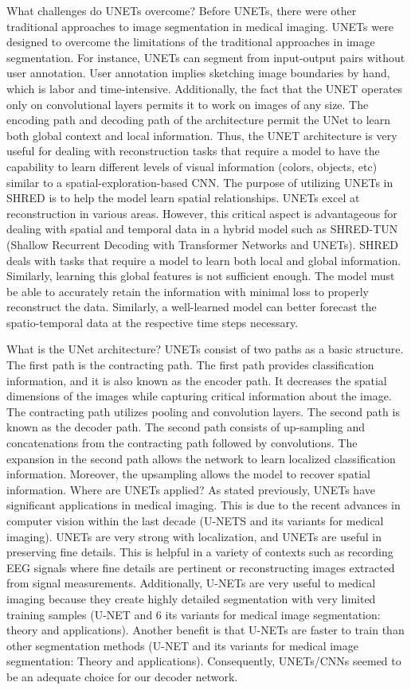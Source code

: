 \documentclass[11pt, a4paper]{article}
\begin{document}
What challenges do UNETs overcome? Before UNETs, there were other traditional approaches to image
segmentation in medical imaging. UNETs were designed to overcome the limitations of the traditional
approaches in image segmentation. For instance, UNETs can segment from input-output pairs without user
annotation. User annotation implies sketching image boundaries by hand, which is labor and time-intensive.
Additionally, the fact that the UNET operates only on convolutional layers permits it to work on images
of any size. The encoding path and decoding path of the architecture permit the UNet to learn both global
context and local information. Thus, the UNET architecture is very useful for dealing with reconstruction
tasks that require a model to have the capability to learn different levels of visual information (colors, objects,
etc) similar to a spatial-exploration-based CNN.
The purpose of utilizing UNETs in SHRED is to help the model learn spatial relationships. UNETs excel
at reconstruction in various areas. However, this critical aspect is advantageous for dealing with spatial
and temporal data in a hybrid model such as SHRED-TUN (Shallow Recurrent Decoding with Transformer
Networks and UNETs). SHRED deals with tasks that require a model to learn both local and global
information. Similarly, learning this global features is not sufficient enough. The model must be able to
accurately retain the information with minimal loss to properly reconstruct the data. Similarly, a well-learned
model can better forecast the spatio-temporal data at the respective time steps necessary.

What is the UNet architecture? UNETs consist of two paths as a basic structure. The first path is the
contracting path. The first path provides classification information, and it is also known as the encoder path.
It decreases the spatial dimensions of the images while capturing critical information about the image. The
contracting path utilizes pooling and convolution layers. The second path is known as the decoder path. The
second path consists of up-sampling and concatenations from the contracting path followed by convolutions.
The expansion in the second path allows the network to learn localized classification information. Moreover,
the upsampling allows the model to recover spatial information.
Where are UNETs applied? As stated previously, UNETs have significant applications in medical imaging. This
is due to the recent advances in computer vision within the last decade (U-NETS and its variants for medical
imaging). UNETs are very strong with localization, and UNETs are useful in preserving fine details. This is
helpful in a variety of contexts such as recording EEG signals where fine details are pertinent or reconstructing
images extracted from signal measurements. Additionally, U-NETs are very useful to medical imaging because they create highly detailed segmentation with very limited training samples (U-NET and
6
its variants for medical image segmentation: theory and applications). Another benefit is that U-NETs are
faster to train than other segmentation methods (U-NET and its variants for medical image segmentation:
Theory and applications). Consequently, UNETs/CNNs seemed to be an adequate choice for our decoder
network.
\end{document}
